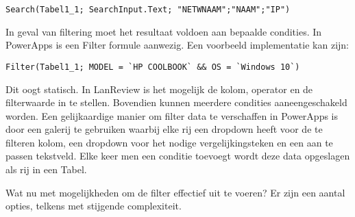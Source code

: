 \begin{lstlisting}
Search(Tabel1_1; SearchInput.Text; "NETWNAAM";"NAAM";"IP")
\end{lstlisting}

In geval van filtering moet het resultaat voldoen aan bepaalde condities. In PowerApps is een Filter formule aanwezig. Een voorbeeld implementatie kan zijn:

\begin{lstlisting}
Filter(Tabel1_1; MODEL = `HP COOLBOOK` && OS = `Windows 10`)
\end{lstlisting}

Dit oogt statisch. In LanReview is het mogelijk de kolom, operator en de filterwaarde in te stellen. Bovendien kunnen meerdere condities aaneengeschakeld worden.
Een gelijkaardige manier om filter data te verschaffen in PowerApps is door een galerij te gebruiken waarbij elke rij een dropdown heeft voor de te filteren kolom, een dropdown voor het nodige vergelijkingsteken en een aan te passen tekstveld. Elke keer men een conditie toevoegt wordt deze data opgeslagen als rij in een Tabel.


Wat nu met mogelijkheden om de filter effectief uit te voeren? Er zijn een aantal opties, telkens met stijgende complexiteit.

